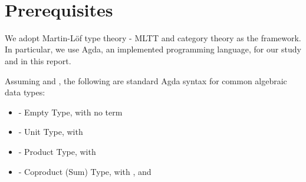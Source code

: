 \begin{code}[hide]%
\>[0]\AgdaSpace{}%
\AgdaSpace{}%
\<%
\\
\>[0]\AgdaSpace{}%
\AgdaSpace{}%
\<%
\\
\>[0]\AgdaSpace{}%
\AgdaSpace{}%
\<%
\\
%
\\[\AgdaEmptyExtraSkip]%
\>[0]\AgdaSpace{}%
\AgdaSymbol{:}\AgdaSpace{}%
\<%
\\
\>[0]\AgdaSpace{}%
\AgdaSymbol{=}\AgdaSpace{}%
\<%
\\
%
\\[\AgdaEmptyExtraSkip]%
\>[0]\AgdaSpace{}%
\AgdaSpace{}%
\<%
\\
\>[0]%
\>[7]\AgdaSpace{}%
\<%
\end{code}

\chapter{Prerequisites}

We adopt Martin-L\"{o}f type theory - MLTT and category theory as the framework. In particular, we use Agda, an implemented programming language, for our study and in this report.

Assuming  \AgdaSymbol{:}  and  \AgdaSymbol{:} , the following are standard Agda syntax for common algebraic data types:

\begin{itemize}
  \item{ - Empty Type, with no term}
  \item{ - Unit Type, with  \AgdaSymbol{:} }
  \item{ - Product Type, with  \AgdaInductiveConstructor{,}  \AgdaSymbol{:}   }
  \item{ - Coproduct (Sum) Type, with   \AgdaSymbol{:}   , and   \AgdaSymbol{:}    }
\end{itemize}

